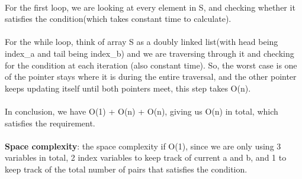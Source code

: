 \documentclass{assignment-373}
\begin{document}
\begin{enumerate}
{  \\
  \phantom{=} \phantom{=} \phantom{=} \phantom{=} For the first loop, we are looking at every element in S, and checking whether it satisfies the condition(which takes constant time to calculate).\\
  \\
  \phantom{=} \phantom{=} \phantom{=} \phantom{=} For the while loop, think of array S as a doubly linked list(with head being index\_a and tail being index\_b) and we are traversing through it and checking for the condition at each iteration (also constant time). So, the worst case is one of the pointer stays where it is during the entire traversal, and the other pointer keeps updating itself until both pointers meet, this step takes O(n).\\
  \\
  \phantom{=} \phantom{=} \phantom{=} \phantom{=} In conclusion, we have O(1) + O(n) + O(n), giving us O(n) in total, which satisfies the requirement.\\
  \\
  \phantom{=} \phantom{=} {\bf Space complexity}: the space complexity if O(1), since we are only using 3 variables in total, 2 index variables to keep track of current a and b, and 1 to keep track of the total number of pairs that satisfies the condition.\\
  \\
  }
\end{enumerate}
\end{document}
